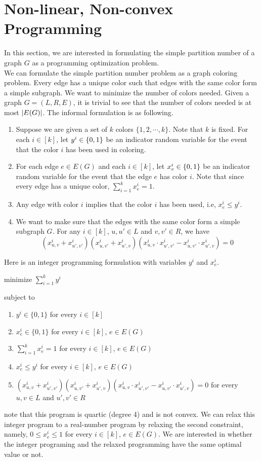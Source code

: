 \section{Non-linear, Non-convex Programming}
In this section, we are interested in formulating the simple partition number of a graph $ G $ as a programming optimization problem. \\
We can formulate the simple partition number problem as a graph coloring problem. Every edge has a unique color such that edges with the same color form a simple subgraph. We want to minimize the number of colors needed. Given a graph $ G = (L, R, E)$, it is trivial to see that the number of colors needed is at most $ \left\vert{E(G)}\right\vert $. The informal formulation is as following. 
\begin{enumerate}
	\item Suppose we are given a set of $ k $ colors $ \{1, 2, \cdots , k \} $. Note that $ k $ is fixed. For each $  i \in [k] $, let $ y^i \in {\{0,1\}} $ be an indicator random variable for the event that the color $ i $ has been used in coloring. 
	\item For each edge $ e \in E(G) $ and each $ i \in [k] $, let $ x_e^i \in {\{0,1\}} $ be an indicator random variable for the event that the edge $ e $ has color $ i $. Note that since every edge has a unique color, $ \sum\limits_{i = 1}^k x_e^i = 1 $. 
	\item Any edge with color $ i $ implies that the color $ i $ has been used, i.e, $ x_e^i \leq y^i $. 
	\item We want to make sure that the edges with the same color  form a simple subgraph $ G $. For any $ i \in [k]$, $ u, u' \in L $ and $ v, v' \in R  $, we have 
	$$(x_{u,v}^i + x_{u',v'}^i) (x_{u,v'}^i + x_{u',v}^i)( x_{u,v}^i \cdot x_{u', v'}^i - x_{u, v'}^i \cdot x_{u', v}^i) = 0 $$
\end{enumerate}
Here is an integer programming formulation with variables $ y^i $ and $ x_e^i $. 

minimize $ \sum\limits_{i =1}^k y^i $ 

subject to 
\begin{enumerate}
	\item $ y^i \in \{0,1 \} $ for every $ i \in [k] $
	\item $ x_e^i \in \{ 0,1 \} $ for every $  i \in [k] $, $  e \in E(G) $
	\item $ \sum\limits_{i =1}^k x_e^i = 1 $ for every $  i \in [k] $, $  e \in E(G) $
	\item $ x_e^i \leq y^i $ for every $  i \in [k] $, $  e \in E(G) $
	\item $(x_{u,v}^i + x_{u',v'}^i) (x_{u,v'}^i + x_{u',v}^i)( x_{u,v}^i \cdot x_{u', v'}^i - x_{u, v'}^i \cdot x_{u', v}^i) = 0 $ for every $ u, v\in L $ and $ u', v' \in R $
\end{enumerate}
note that this program is quartic (degree 4) and is not convex. We can relax this integer program to a real-number program by relaxing the second constraint, namely, $ 0 \leq x_e^i  \leq 1 $ for every $  i \in [k] $, $  e \in E(G) $. We are interested in whether the integer programing and the relaxed programming have the same optimal value or not. 


